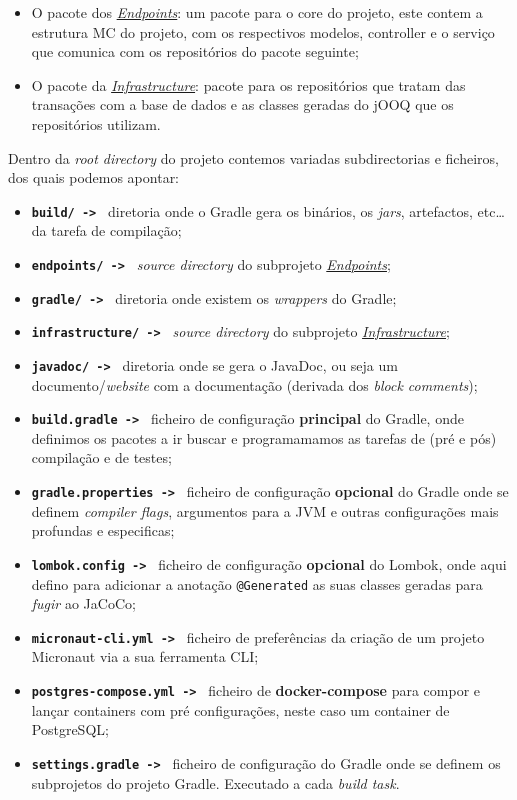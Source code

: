 \begin{itemize}
  \item O pacote dos \hyperref[endp]{\textit{Endpoints}}: um pacote para o core do projeto, este contem a estrutura MC do projeto, com os respectivos modelos, controller e o serviço que comunica com os repositórios do pacote seguinte;
  \item O pacote da \hyperref[infra]{\textit{Infrastructure}}: pacote para os repositórios que tratam das transações com a base de dados e as classes geradas do jOOQ que os repositórios utilizam.
\end{itemize}

Dentro da \textit{root directory} do projeto contemos variadas subdirectorias e ficheiros, dos quais podemos apontar:

\begin{itemize}
  \item \texttt{\textbf{build/ -> }} diretoria onde o Gradle gera os binários, os \textit{jars}, artefactos, etc\ldots da tarefa de compilação;
  \item \texttt{\textbf{endpoints/ -> }} \textit{source directory} do subprojeto \hyperref[endp]{\textit{Endpoints}};
  \item \texttt{\textbf{gradle/ -> }} diretoria onde existem os \textit{wrappers} do Gradle;
  \item \texttt{\textbf{infrastructure/ -> }} \textit{source directory} do subprojeto \hyperref[infra]{\textit{Infrastructure}};
  \item \texttt{\textbf{javadoc/ -> }} diretoria onde se gera o JavaDoc, ou seja um documento/\textit{website} com a documentação (derivada dos \textit{block comments});
  \item \texttt{\textbf{build.gradle -> }} ficheiro de configuração \textbf{principal} do Gradle, onde definimos os pacotes a ir buscar e programamamos as tarefas de (pré e pós) compilação e de testes;
  \item \texttt{\textbf{gradle.properties -> }} ficheiro de configuração \textbf{opcional} do Gradle onde se definem \textit{compiler flags}, argumentos para a JVM e outras configurações mais profundas e especificas;
  \item \texttt{\textbf{lombok.config -> }} ficheiro de configuração \textbf{opcional} do Lombok, onde aqui defino para adicionar a anotação \texttt{@Generated} as suas classes geradas para \textit{fugir} ao JaCoCo;
  \item \texttt{\textbf{micronaut-cli.yml -> }} ficheiro de preferências da criação de um projeto Micronaut via a sua ferramenta CLI;
  \item \texttt{\textbf{postgres-compose.yml -> }} ficheiro de \textbf{docker-compose} para compor e lançar containers com pré configurações, neste caso um container de PostgreSQL;
  \item \texttt{\textbf{settings.gradle -> }} ficheiro de configuração do Gradle onde se definem os subprojetos do projeto Gradle. Executado a cada \textit{build task}.
\end{itemize}


